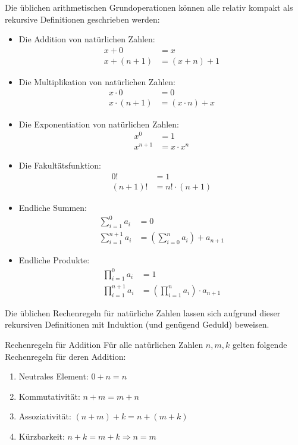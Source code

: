 \begin{example}
    Die üblichen arithmetischen Grundoperationen können alle relativ kompakt als rekursive Definitionen geschrieben werden:
    \begin{itemize}
        \item Die Addition von natürlichen Zahlen:
            \begin{align*}
                x+0&=x\\
                x+(n+1)&=(x+n)+1
            \end{align*}
        \item Die Multiplikation von natürlichen Zahlen:
            \begin{align*}
                x\cdot 0 &= 0\\
                x\cdot(n+1)&=(x\cdot n)+x
            \end{align*}
        \item Die Exponentiation von natürlichen Zahlen:
            \begin{align*}
                x^0&=1\\
                x^{n+1}&=x\cdot x^{n}
            \end{align*}
        \item Die Fakultätsfunktion:
            \begin{align*}
                0!&=1\\
                (n+1)!&=n!\cdot(n+1)
            \end{align*}
        \item Endliche Summen:
            \begin{align*}
                \sum_{i=1}^{0}a_i&=0\\
                \sum_{i=1}^{n+1}a_{i}&=(\sum_{i=0}^na_i)+a_{n+1}
            \end{align*}
        \item Endliche Produkte:
            \begin{align*}
                \prod_{i=1}^{0}a_i&=1\\
                \prod_{i=1}^{n+1}a_i&= (\prod_{i=1}^na_i)\cdot a_{n+1}
            \end{align*}
    \end{itemize}
\end{example}

Die üblichen Rechenregeln für natürliche Zahlen lassen sich aufgrund dieser rekursiven Definitionen mit Induktion (und genügend Geduld) beweisen.

\begin{lemma}{Rechenregeln für Addition}
    Für alle natürlichen Zahlen $n,m,k$ gelten folgende Rechenregeln für deren Addition:
    \begin{enumerate}
        \item Neutrales Element: $0+n=n$
        \item Kommutativität: $n+m=m+n$
        \item Assoziativität: $(n+m)+k=n+(m+k)$
        \item Kürzbarkeit: $n+k=m+k\Rightarrow n=m$
    \end{enumerate}
\end{lemma}

